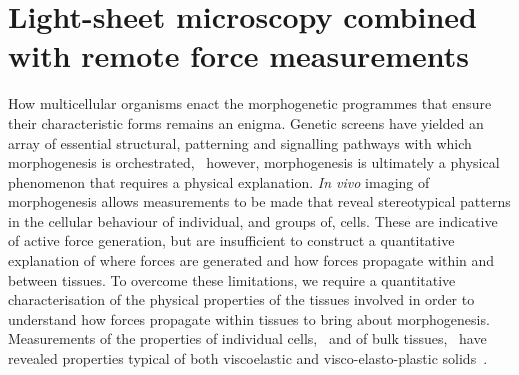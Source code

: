 
\ifpdf{}
    \graphicspath{{Chapters/tweezers/Figs/Raster/}{Chapters/tweezers/Figs/PDF/}{Chapters/tweezers/Figs/}}
\else
    \graphicspath{{Chapters/tweezers/Figs/Vector/}{Chapters/tweezers/Figs/}}
\fi

\chapter[Light-sheet microscopy combined with remote force measurements]{Light-sheet microscopy combined with remote force measurements}\label{chapter:tweezers}
How multicellular organisms enact the morphogenetic programmes that ensure their characteristic forms remains an enigma.
Genetic screens have yielded an array of essential structural, patterning and signalling pathways with which morphogenesis is orchestrated,~\cite{gilbertDevelopmentalBiology2000} however, morphogenesis is ultimately a physical phenomenon that requires a physical explanation.
\emph{In vivo} imaging of morphogenesis allows measurements to be made that reveal stereotypical patterns in the cellular behaviour of individual, and groups of, cells.
These are indicative of active force generation, but are insufficient to construct a quantitative explanation of where forces are generated and how forces propagate within and between tissues.
To overcome these limitations, we require a quantitative characterisation of the physical properties of the tissues involved in order to understand how forces propagate within tissues to bring about morphogenesis.
Measurements of the properties of individual cells,~\cite{mammotoMechanicalControlTissue2010} and of bulk tissues,~\cite{mammotoMechanobiologyDevelopmentalControl2013} have revealed properties typical of both viscoelastic and visco-elasto-plastic solids~\cite{
heisenbergForcesTissueMorphogenesis2013}.
